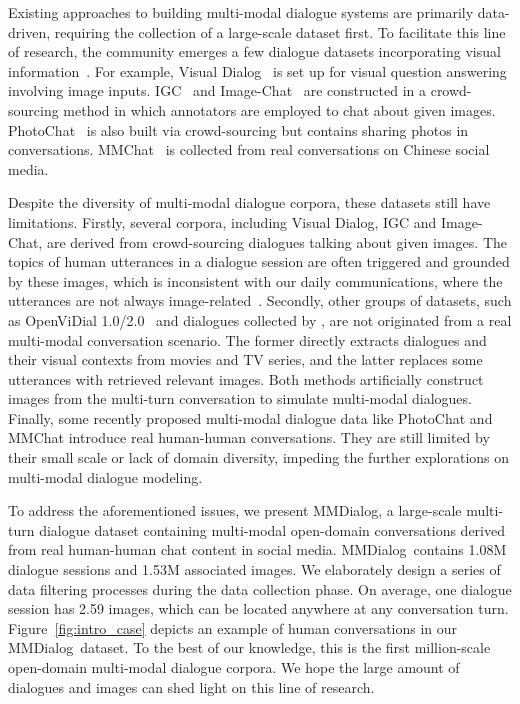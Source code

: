 \documentclass[11pt]{article}
\newcommand{\DataName}{MMDialog}
\begin{document}
Existing approaches to building multi-modal dialogue systems are primarily data-driven, requiring the collection of a large-scale dataset first. To facilitate this line of research, the community emerges a few dialogue datasets incorporating visual information~\cite{meng2020openvidial,wang2021openvidial,zang-etal-2021-photochat,zheng-etal-2022-mmchat}. For example, Visual Dialog~\cite{das2017visual} is set up for visual question answering involving image inputs. IGC~\cite{mostafazadeh-etal-2017-image} and Image-Chat~\cite{shuster-etal-2020-image} are constructed in a crowd-sourcing method in which annotators are employed to chat about given images. PhotoChat~\cite{zang-etal-2021-photochat} is also built via crowd-sourcing but contains sharing photos in conversations. MMChat~\cite{zheng-etal-2022-mmchat} is collected from real conversations on Chinese social media.

Despite the diversity of multi-modal dialogue corpora, these datasets still have limitations. Firstly, several corpora, including Visual Dialog, IGC and Image-Chat, are derived from crowd-sourcing dialogues talking about given images. The topics of human utterances in a dialogue session are often triggered and grounded by these images, which is inconsistent with our daily communications, where the utterances are not always image-related~\cite{zheng-etal-2022-mmchat}. Secondly, other groups of datasets, such as OpenViDial 1.0/2.0~\cite{meng2020openvidial,wang2021openvidial} and dialogues collected by \citet{lee-etal-2021-constructing}, are not originated from a real multi-modal conversation scenario. The former directly extracts dialogues and their visual contexts from movies and TV series, and the latter replaces some utterances with retrieved relevant images. Both methods artificially construct images from the multi-turn conversation to simulate multi-modal dialogues. Finally, some recently proposed multi-modal dialogue data like PhotoChat and MMChat introduce real human-human conversations. They are still limited by their small scale or lack of domain diversity, impeding the further explorations on multi-modal dialogue modeling.  

To address the aforementioned issues, we present \DataName, a large-scale multi-turn dialogue dataset containing multi-modal open-domain conversations derived from real human-human chat content in social media. \DataName~contains 1.08M dialogue sessions and 1.53M associated images. We elaborately design a series of data filtering processes during the data collection phase. On average, one dialogue session has 2.59 images, which can be located anywhere at any conversation turn.  {Figure~\ref{fig:intro_case} depicts an example of human conversations in our \DataName~dataset.} To the best of our knowledge, this is the first million-scale open-domain multi-modal dialogue corpora. We hope the large amount of dialogues and images can shed light on this line of research.
\end{document}
